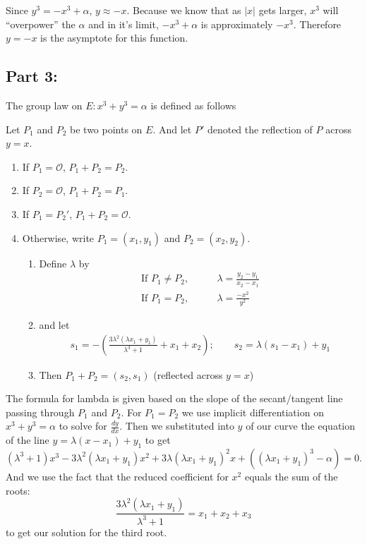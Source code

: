 \documentclass[12pt,letterpaper]{article}
\begin{document}
    Since $y^3 = -x^3+\alpha$, $y \approx -x$. Because we know that as $\lvert x\rvert$ gets larger, $x^3$ will ``overpower'' the $\alpha$ and in it's limit, $-x^3 + \alpha$ is approximately $-x^3$. Therefore $y=-x$ is the asymptote for this function.
\subsection*{Part 3:}
    The group law on $E: x^3 + y^3 = \alpha$ is defined as follows
    
    Let $P_1$ and $P_2$ be two points on $E$. And let $P'$ denoted the reflection of $P$ across $y=x$.
    \begin{enumerate}[label=(\alph*)]
        \item If $P_1 = \mathcal{O}$, $P_1 + P_2 = P_2$.
        \item If $P_2 = \mathcal{O}$, $P_1 + P_2 = P_1$.
        \item If $P_1 = P_2'$, $P_1 + P_2 = \mathcal{O}$.
        \item Otherwise, write $P_1=(x_1,y_1)$ and $P_2 = (x_2,y_2)$.
        \begin{enumerate}[label=(\roman*)]
            \item Define $\lambda$ by
            \begin{align*}
                \text{If } P_1\not=P_2, \qquad &\lambda = \frac{y_2-y_1}{x_2-x_1}\\
                \text{If } P_1=P_2, \qquad &\lambda = \frac{-x^2}{y^2}
            \end{align*}
            \item and let 
            \begin{align*}
                s_1 = -\left(\frac{3\lambda^2(\lambda x_1 +y_1)}{\lambda^3+1} + x_1 + x_2\right); \qquad s_2 = \lambda(s_1-x_1)+y_1
            \end{align*}
            \item Then $P_1 + P_2 = (s_2,s_1)$ (reflected across $y=x$)
        \end{enumerate}
    \end{enumerate}
    
    The formula for lambda is given based on the slope of the secant/tangent line passing through $P_1$ and $P_2$. For $P_1=P_2$ we use implicit differentiation on $x^3 + y^3 = \alpha$ to solve for $\frac{dy}{dx}$. Then we substituted into $y$ of our curve the equation of the line $y=\lambda(x-x_1)+y_1$ to get 
    $$(\lambda^3 + 1)x^3 - 3\lambda^2(\lambda x_1 +y_1)x^2 + 3\lambda(\lambda x_1 +y_1)^2x + \left((\lambda x_1 +y_1)^3 - \alpha\right) = 0.$$
    And we use the fact that the reduced coefficient for $x^2$ equals the sum of the roots:
    $$\frac{3\lambda^2(\lambda x_1 +y_1)}{\lambda^3+1}=x_1+x_2+x_3$$
    to get our solution for the third root.
    
\end{document}

